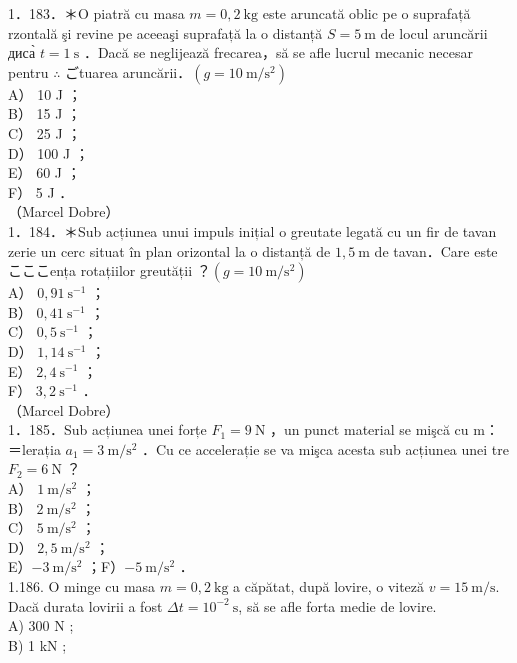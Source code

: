 \documentclass[10pt]{article}
\begin{document}
1．183．＊O piatră cu masa $m=0,2 \mathrm{~kg}$ este aruncată oblic pe o suprafață rzontală şi revine pe aceeaşi suprafață la o distanță $S=5 \mathrm{~m}$ de locul aruncării диса̀ $t=1 \mathrm{~s}$ ．Dacă se neglijează frecarea，să se afle lucrul mecanic necesar pentru $\therefore$ ごtuarea aruncării．$\left(g=10 \mathrm{~m} / \mathrm{s}^{2}\right)$\\
A） 10 J ；\\
B） 15 J ；\\
C） 25 J ；\\
D） 100 J ；\\
E） 60 J ；\\
F） 5 J ．\\
（Marcel Dobre）\\
1．184．＊Sub acțiunea unui impuls inițial o greutate legată cu un fir de tavan zerie un cerc situat în plan orizontal la o distanță de $1,5 \mathrm{~m}$ de tavan．Care este こここența rotațiilor greutății ？$\left(g=10 \mathrm{~m} / \mathrm{s}^{2}\right)$\\
A） $0,91 \mathrm{~s}^{-1}$ ；\\
B） $0,41 \mathrm{~s}^{-1}$ ；\\
C） $0,5 \mathrm{~s}^{-1}$ ；\\
D） $1,14 \mathrm{~s}^{-1}$ ；\\
E） $2,4 \mathrm{~s}^{-1}$ ；\\
F） $3,2 \mathrm{~s}^{-1}$ ．\\
（Marcel Dobre）\\
1．185．Sub acțiunea unei forțe $F_{1}=9 \mathrm{~N}$ ，un punct material se mişcă cu m：＝lerația $a_{1}=3 \mathrm{~m} / \mathrm{s}^{2}$ ．Cu ce accelerație se va mişca acesta sub acțiunea unei tre $F_{2}=6 \mathrm{~N}$ ？\\
A） $1 \mathrm{~m} / \mathrm{s}^{2}$ ；\\
B） $2 \mathrm{~m} / \mathrm{s}^{2}$ ；\\
C） $5 \mathrm{~m} / \mathrm{s}^{2}$ ；\\
D） $2,5 \mathrm{~m} / \mathrm{s}^{2}$ ；\\
E）$-3 \mathrm{~m} / \mathrm{s}^{2}$ ；F）$-5 \mathrm{~m} / \mathrm{s}^{2}$ ．\\
1.186. O minge cu masa $m=0,2 \mathrm{~kg}$ a căpătat, după lovire, o viteză $v=15 \mathrm{~m} / \mathrm{s}$. Dacă durata lovirii a fost $\Delta t=10^{-2} \mathrm{~s}$, să se afle forta medie de lovire.\\
A) 300 N ;\\
B) 1 kN ;\\
\end{document}
